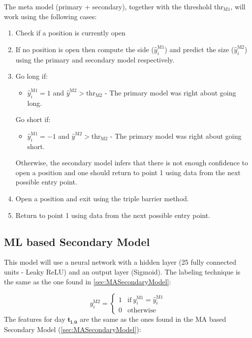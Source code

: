 \documentclass[a4paper]{article}
\begin{document}
The meta model (primary + secondary), together with the threshold 
$\text{thr}_{\text{M1}}$, will work using the following cases:

\begin{enumerate}
	\item Check if a position is currently open
	
	\item If no position is open then compute the side 
	($\hat{y}_i^{\text{M1}}$) and predict the size 
	($\hat{y}_i^{\text{M2}}$) using the primary and secondary model 
	respectively.
	
	\item 
	Go long if: 
		\begin{itemize}
			\item $\hat{y}_i^{\text{M1}} = 1$ and 
			$\hat{y}^{\text{M2}} > \text{thr}_{\text{M2}}$ - The 
			primary model was right about going long.
		\end{itemize}
	
	Go short if:
		\begin{itemize}
			\item $\hat{y}_i^{\text{M1}} = -1$ and 
			$\hat{y}^{\text{M2}} > \text{thr}_{\text{M2}}$ - The 
			primary model was right about going short.
		\end{itemize}

	Otherwise, the secondary model infers that there is not enough 
	confidence to open a position and one should return to point 1 
	using data from the	next possible entry point.
	
	\item Open a position and exit using the triple barrier method.
	
	\item Return to point 1 using data from the next possible entry 
	point.
\end{enumerate}

\subsection{ML based Secondary Model}
\label{sec:MLSecondaryModel}
This model will use a neural network with a hidden layer (25 fully 
connected units - Leaky ReLU) and an output layer (Sigmoid). The 
labeling technique is the same as the one found in 
\ref{sec:MASecondaryModel}:

\begin{equation*}
	y^{\text{M2}}_i =
	\begin{cases}
	1 & \text{if}\ y^{\text{M1}}_i = \hat{y}^{\text{M1}}_i\\
	0 & \text{otherwise}
	\end{cases}
\end{equation*}
The features for day $\boldsymbol{t_{i,0}}$ are the same as the ones 
found in the MA based Secondary Model (\ref{sec:MASecondaryModel}): \\
\end{document}
